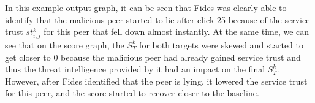 In this example output graph, it can be seen that Fides was clearly able to identify that the malicious peer started to lie after click 25 because of the service trust $st^{k}_{i,j}$ for this peer that fell down almost instantly.
At the same time, we can see that on the score graph, the $S^{k}_{T}$ for both targets were skewed and started to get closer to $0$ because the malicious peer had already gained service trust and thus the threat intelligence provided by it had an impact on the final $S^{k}_{T}$.
However, after Fides identified that the peer is lying, it lowered the service trust for this peer, and the score started to recover closer to the baseline.